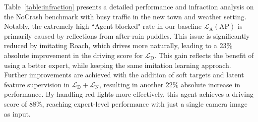 \hspace{1pc}Table~\ref{table:infraction} presents a detailed performance and infraction analysis on the NoCrash benchmark with busy traffic in the new town and weather setting. 
Notably, the extremely high ``Agent blocked" rate in our baseline $\mathcal{L}_\text{A}(\text{AP})$ is primarily caused by reflections from after-rain puddles. 
This issue is significantly reduced by imitating Roach, which drives more naturally, leading to a 23\% absolute improvement in the driving score for $\mathcal{L}_\text{D}$. 
This gain reflects the benefit of using a better expert, while keeping the same imitation learning approach. 
Further improvements are achieved with the addition of soft targets and latent feature supervision in $\mathcal{L}_\text{D}+\mathcal{L}_\text{N}$, resulting in another 22\% absolute increase in performance. 
By handling red lights more effectively, this agent achieves a driving score of 88\%, reaching expert-level performance with just a single camera image as input.





 